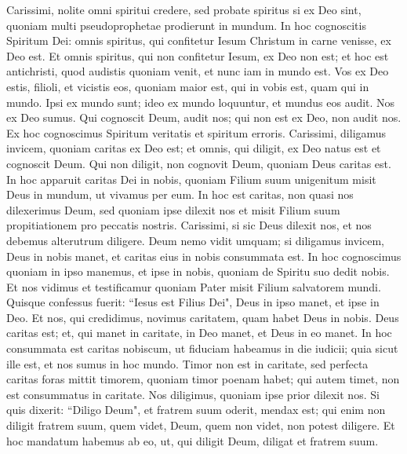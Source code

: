 \begin{biblechapter} 
\verse Carissimi, nolite omni spiritui credere, sed probate spiritus si ex Deo sint, quoniam multi pseudoprophetae prodierunt in mundum. 
\verse In hoc cognoscitis Spiritum Dei: omnis spiritus, qui confitetur Iesum Christum in carne venisse, ex Deo est.  
\verse Et omnis spiritus, qui non confitetur Iesum, ex Deo non est; et hoc est antichristi, quod audistis quoniam venit, et nunc iam in mundo est. 
\verse Vos ex Deo estis, filioli, et vicistis eos, quoniam maior est, qui in vobis est, quam qui in mundo. 
\verse Ipsi ex mundo sunt; ideo ex mundo loquuntur, et mundus eos audit. 
\verse Nos ex Deo sumus. Qui cognoscit Deum, audit nos; qui non est ex Deo, non audit nos. Ex hoc cognoscimus Spiritum veritatis et spiritum erroris. 
\verse Carissimi, diligamus invicem, quoniam caritas ex Deo est; et omnis, qui diligit, ex Deo natus est et cognoscit Deum. 
\verse Qui non diligit, non cognovit Deum, quoniam Deus caritas est. 
\verse In hoc apparuit caritas Dei in nobis, quoniam Filium suum unigenitum misit Deus in mundum, ut vivamus per eum. 
\verse In hoc est caritas, non quasi nos dilexerimus Deum, sed quoniam ipse dilexit nos et misit Filium suum propitiationem pro peccatis nostris. 
\verse Carissimi, si sic Deus dilexit nos, et nos debemus alterutrum diligere.  
\verse Deum nemo vidit umquam; si diligamus invicem, Deus in nobis manet, et caritas eius in nobis consummata est. 
\verse In hoc cognoscimus quoniam in ipso manemus, et ipse in nobis, quoniam de Spiritu suo dedit nobis. 
\verse Et nos vidimus et testificamur quoniam Pater misit Filium salvatorem mundi. 
\verse Quisque confessus fuerit: “Iesus est Filius Dei", Deus in ipso manet, et ipse in Deo.  
\verse Et nos, qui credidimus, novimus caritatem, quam habet Deus in nobis. Deus caritas est; et, qui manet in caritate, in Deo manet, et Deus in eo manet. 
\verse In hoc consummata est caritas nobiscum, ut fiduciam habeamus in die iudicii; quia sicut ille est, et nos sumus in hoc mundo. 
\verse Timor non est in caritate, sed perfecta caritas foras mittit timorem, quoniam timor poenam habet; qui autem timet, non est consummatus in caritate. 
\verse Nos diligimus, quoniam ipse prior dilexit nos. 
\verse Si quis dixerit: “Diligo Deum", et fratrem suum oderit, mendax est; qui enim non diligit fratrem suum, quem videt, Deum, quem non videt, non potest diligere. 
\verse Et hoc mandatum habemus ab eo, ut, qui diligit Deum, diligat et fratrem suum. 
\end{biblechapter}

